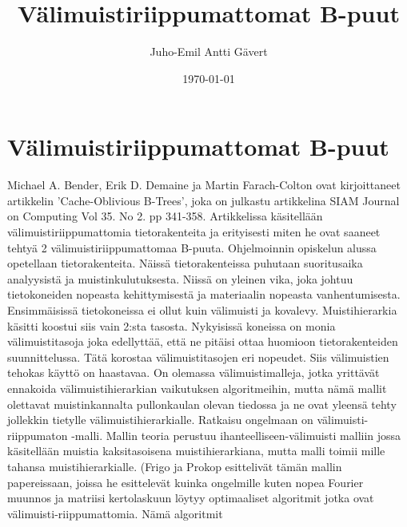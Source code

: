 \documentclass[finnish]{tktltiki2}
\title{Välimuistiriippumattomat B-puut}
\author{Juho-Emil Antti Gävert}
\date{\today}
\theoremstyle{definition}
\theoremstyle{remark}
\begin{document}

\maketitle        %
\makeabstract     %

\newpage          %



\section{Välimuistiriippumattomat B-puut}


Michael A. Bender, Erik D. Demaine ja Martin Farach-Colton ovat kirjoittaneet
artikkelin 'Cache-Oblivious B-Trees', joka on julkastu artikkelina SIAM Journal
on Computing Vol 35. No 2. pp 341-358. Artikkelissa käsitellään
välimuistiriippumattomia tietorakenteita ja erityisesti miten he ovat saaneet
tehtyä 2 välimuistiriippumattomaa B-puuta.
\newline \indent Ohjelmoinnin opiskelun alussa opetellaan tietorakenteita.
Näissä tietorakenteissa puhutaan suoritusaika analyysistä ja
muistinkulutuksesta. Niissä on yleinen vika, joka johtuu tietokoneiden nopeasta
kehittymisestä ja materiaalin nopeasta vanhentumisesta. Ensimmäisissä
tietokoneissa ei ollut kuin välimuisti ja kovalevy. Muistihierarkia käsitti
koostui siis vain 2:sta tasosta. Nykyisissä koneissa on monia välimuistitasoja
joka edellyttää, että ne pitäisi ottaa huomioon tietorakenteiden
suunnittelussa. Tätä korostaa välimuistitasojen eri nopeudet. Siis välimuistien
tehokas käyttö on haastavaa. On olemassa välimuistimalleja, jotka yrittävät
ennakoida välimuistihierarkian vaikutuksen algoritmeihin, mutta nämä mallit
olettavat muistinkannalta pullonkaulan olevan tiedossa ja ne ovat yleensä tehty
jollekkin tietylle välimuistihierarkialle.
\newline \indent Ratkaisu ongelmaan on välimuisti-riippumaton -malli. Mallin teoria perustuu
ihanteelliseen-välimuisti malliin jossa käsitellään muistia kaksitasoisena
muistihierarkiana, mutta malli toimii mille tahansa muistihierarkialle. (Frigo
ja Prokop esittelivät tämän mallin papereissaan, joissa he esittelevät kuinka
ongelmille kuten nopea Fourier muunnos ja matriisi kertolaskuun löytyy
optimaaliset algoritmit jotka ovat välimuisti-riippumattomia. Nämä algoritmit
\end{document}
